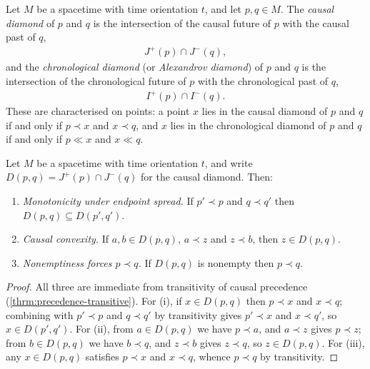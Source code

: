 \begin{definition}
    \label{def:causal-diamond}
    \leanok
    Let $M$ be a spacetime with time orientation $t$, and let $p, q \in M$. The \textit{causal diamond} of $p$ and $q$ is the intersection of the causal future of $p$ with the causal past of $q$,
    \begin{align}
        J^+(p) \cap J^-(q),
    \end{align}
    and the \textit{chronological diamond} (or \textit{Alexandrov diamond}) of $p$ and $q$ is the intersection of the chronological future of $p$ with the chronological past of $q$,
    \begin{align}
        I^+(p) \cap I^-(q).
    \end{align}
    These are characterised on points: a point $x$ lies in the causal diamond of $p$ and $q$ if and only if $p \prec x$ and $x \prec q$, and $x$ lies in the chronological diamond of $p$ and $q$ if and only if $p \ll x$ and $x \ll q$.
\end{definition}

\medskip

\begin{lemma}
    \label{lmm:causal-diamond-structure}
    \leanok
    Let $M$ be a spacetime with time orientation $t$, and write $D(p,q) = J^+(p) \cap J^-(q)$ for the causal diamond. Then:
    \begin{enumerate}
        \item \textit{Monotonicity under endpoint spread.} If $p' \prec p$ and $q \prec q'$ then $D(p,q) \subseteq D(p',q')$.
        \item \textit{Causal convexity.} If $a, b \in D(p,q)$, $a \prec z$ and $z \prec b$, then $z \in D(p,q)$.
        \item \textit{Nonemptiness forces $p \prec q$.} If $D(p,q)$ is nonempty then $p \prec q$.
    \end{enumerate}
\end{lemma}
\begin{proof}
    \leanok
    All three are immediate from transitivity of causal precedence (\ref{thrm:precedence-transitive}). For (i), if $x \in D(p,q)$ then $p \prec x$ and $x \prec q$; combining with $p' \prec p$ and $q \prec q'$ by transitivity gives $p' \prec x$ and $x \prec q'$, so $x \in D(p',q')$. For (ii), from $a \in D(p,q)$ we have $p \prec a$, and $a \prec z$ gives $p \prec z$; from $b \in D(p,q)$ we have $b \prec q$, and $z \prec b$ gives $z \prec q$, so $z \in D(p,q)$. For (iii), any $x \in D(p,q)$ satisfies $p \prec x$ and $x \prec q$, whence $p \prec q$ by transitivity.
\end{proof}

